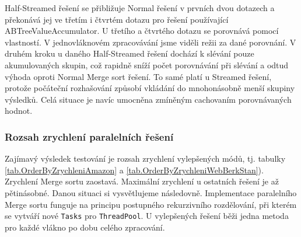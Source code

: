 Half-Streamed řešení se přibližuje Normal řešení v prvních dvou dotazech a překonává jej ve třetím i čtvrtém dotazu pro řešení používající ABTreeValueAccumulator.
U třetího a čtvrtého dotazu se porovnává pomocí vlastností. V jednovláknovém zpracovávání jsme viděli režii za dané porovnání.
V druhém kroku u daného Half-Streamed řešení dochází k slévání pouze akumulovaných skupin, což rapidně sníží počet porovnávání při slévání a odtud výhoda oproti Normal Merge sort řešení. 
To samé platí u Streamed řešení, protože počáteční rozhašování způsobí vkládání do mnohonásobně menší skupiny výsledků. 
Celá situace je navíc umocněna zmíněným cachovaním porovnávaných hodnot. 

\subsubsection{Rozsah zrychlení paralelních řešení}

Zajímavý výsledek testování je rozsah zrychlení vylepšených módů, tj. tabulky \ref{tab.OrderByZrychleniAmazon} a \ref{tab.OrderByZrychleniWebBerkStan}). 
Zrychlení Merge sortu zaostavá. 
Maximální zrychlení u ostatních řešení je až pětinásobné. 
Danou situaci si vysvětlujeme následovně.
Implementace paralelního Merge sortu funguje na principu postupného rekurzivního rozdělování, při kterém se vytváří nové \verb+Tasks+ pro \verb+ThreadPool+.
U vylepšených řešení běži jedna metoda pro každé vlákno po dobu celého zpracování. 


